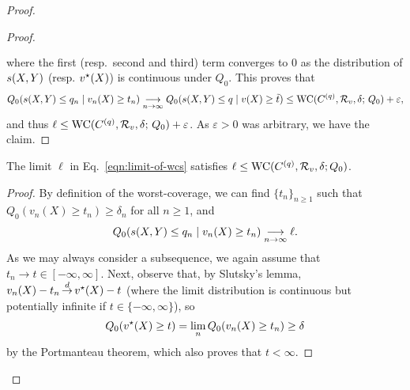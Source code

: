 \begin{proof}
\begin{proof}
\begin{align}
\begin{split}
      \end{split}
    \end{align}
    where the first (resp.\ second and third) term converges to $0$ as the
    distribution of $s(X,Y)$ (resp. $v^\star(X)$) is continuous under $Q_0$.
    This proves that
    \begin{align*}
      Q_0( s(X,Y) \le q_n \mid  v_n(X) \ge t_n) \underset{n \to \infty}{\longrightarrow} Q_0( s(X,Y) \le q \mid v(X) \ge \tilde{t}) \le \textup{WC}(C^{(q)}, \mathcal{R}_{v}, \delta; \, Q_0) + \varepsilon,
    \end{align*}
    and thus $\ell \le \textup{WC}(C^{(q)}, \mathcal{R}_{v}, \delta; \, Q_0) + \varepsilon$.
    As $\varepsilon > 0$ was arbitrary, we have the claim.
  \end{proof}

  \begin{claim}
    \label{claim:upper-limit-wcs}
    The limit $\ell$ in Eq.~\eqref{eqn:limit-of-wcs} satisfies
    $\ell \le \textup{WC}(C^{(q)}, \mathcal{R}_v, \delta; Q_0)$.
  \end{claim}
  \begin{proof}
    By definition of the worst-coverage, we can find $\{ t_n \}_{n \ge 1}$
    such that $Q_0 (v_n(X) \ge t_n) \ge \delta_n$ for all $n \ge 1$, and
    \begin{align*}
      Q_0( s(X,Y) \le q_n \mid v_n(X) \ge t_n) \underset{n \to \infty}{\longrightarrow} \ell.
    \end{align*}
    As we may always consider a subsequence, we again assume that $t_n
    \to t \in [ -\infty, \infty]$.  Next, observe that, by Slutsky's lemma, $v_n(X) - t_n \mathop{\stackrel{d}{\rightarrow}} v^\star(X) - t $
    (where the limit distribution is continuous but potentially infinite if
    $t \in \{ -\infty, \infty\}$), so
    \begin{align}
      \label{eqn:cvg-prob-xtv-lower-semicontinuity}
      Q_0( v^\star(X) \ge t) =  \lim_n Q_0( v_n(X) \ge t_n) \ge  \delta
    \end{align}
    by the Portmanteau theorem,
    which also proves that $t < \infty$.


\end{proof}
\end{proof}
